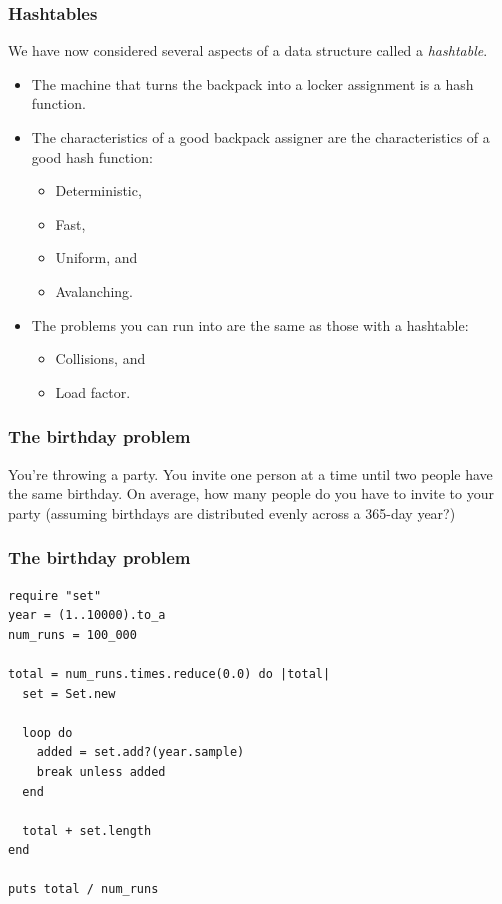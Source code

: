 \documentclass{beamer}
\begin{document}
\begin{frame}
    \frametitle{Hashtables}
    We have now considered several aspects of a data structure called a
    \emph{hashtable}.

    \vspace{1em}

    \begin{itemize}
        \item The machine that turns the backpack into a locker assignment is
              a hash function.
        \item The characteristics of a good backpack assigner are the
              characteristics of a good hash function:
              \begin{itemize}
                  \item Deterministic,
                  \item Fast,
                  \item Uniform, and
                  \item Avalanching.
              \end{itemize}
        \item The problems you can run into are the same as those with a hashtable:
              \begin{itemize}
                  \item Collisions, and
                  \item Load factor.
              \end{itemize}
    \end{itemize}
\end{frame}

\begin{frame}
    \frametitle{The birthday problem}

    You're throwing a party. You invite one person at a time until two people
    have the same birthday. On average, how many people do you have to invite
    to your party (assuming birthdays are distributed evenly across a 365-day
    year?)
\end{frame}

\begin{frame}[fragile]
    \frametitle{The birthday problem}
    \begin{lstlisting}
require "set"
year = (1..10000).to_a
num_runs = 100_000

total = num_runs.times.reduce(0.0) do |total|
  set = Set.new
  
  loop do    
    added = set.add?(year.sample)
    break unless added
  end

  total + set.length
end

puts total / num_runs
    \end{lstlisting}
\end{frame}
\end{document}

